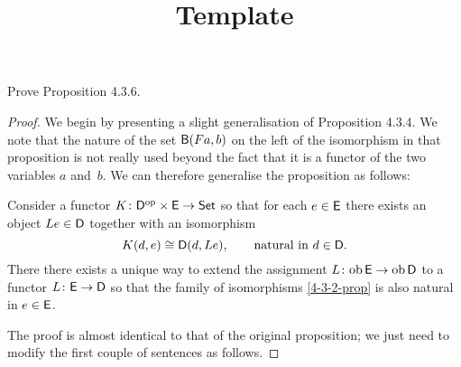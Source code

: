 \documentclass[../../solutions]{subfiles}
\title{Template}
\author{}
\begin{document}
\maketitle

%   

\begin{exercise}
  Prove Proposition 4.3.6.
\end{exercise}

\begin{proof}
  We begin by presenting a slight generalisation of Proposition 4.3.4.
  We note that the nature of the set ${\mathsf{B}}(Fa,b)$ on the left of the
  isomorphism in that proposition is not really used beyond the fact
  that it is a functor of the two variables $a$ and~$b$.  We can
  therefore generalise the proposition as follows:

  \begingroup
  \renewcommand{\thetheorem}{\thesection.$4'$}
  \begin{proposition}
    Consider a functor ${K}\colon{{\mathsf{D}}^{\mathrm{op}}\times{\mathsf{E}}}\to{\ensuremath{\mathsf{Set}}}$ so that for
    each $e\in{\mathsf{E}}$ there exists an object $Le\in{\mathsf{D}}$ together with an
    isomorphism
    \begin{equation}
      \label{4-3-2-prop}
      K(d,e)\cong {\mathsf{D}}(d,Le),\qquad \text{natural in $d\in{\mathsf{D}}$.}
    \end{equation}
    There there exists a unique way to extend the assignment
    ${L}\colon{\operatorname{ob}{\mathsf{E}}}\to{\operatorname{ob}{\mathsf{D}}}$ to a functor ${L}\colon{{\mathsf{E}}}\to{{\mathsf{D}}}$ so
    that the family of isomorphisms \eqref{4-3-2-prop} is also natural
    in $e\in{\mathsf{E}}$.
  \end{proposition}
  \endgroup
  \popthm

  The proof is almost identical to that of the original proposition;
  we just need to modify the first couple of sentences as follows.


\end{proof}
\end{document}
